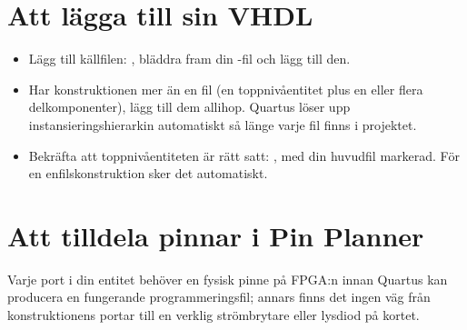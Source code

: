 \section{Att lägga till sin VHDL}
\label{app:quartus:sources}

\begin{itemize}
  \item Lägg till källfilen: , bläddra fram din
    -fil och lägg till den.
  \item Har konstruktionen mer än en fil (en toppnivåentitet plus en eller flera delkomponenter),
    lägg till dem allihop. Quartus löser upp instansieringshierarkin automatiskt så länge varje fil
    finns i projektet.
  \item Bekräfta att toppnivåentiteten är rätt satt: , med
    din huvudfil markerad. För en enfilskonstruktion sker det automatiskt.
\end{itemize}

\section{Att tilldela pinnar i Pin Planner}
\label{app:quartus:pins}

Varje port i din entitet behöver en fysisk pinne på FPGA:n innan Quartus kan producera en fungerande
programmeringsfil; annars finns det ingen väg från konstruktionens portar till en verklig
strömbrytare eller lysdiod på kortet.

